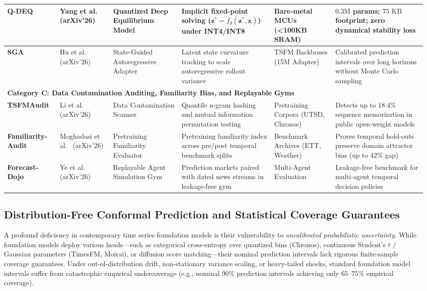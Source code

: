 \begin{table}[t]
{\begin{tabular}{lp{2.2cm}p{3.2cm}p{3.2cm}p{2.6cm}p{4.2cm}}
\midrule
\textbf{Q-DEQ} & Yang et al.~\cite{yang2026qdeq} (arXiv'26) & Quantized Deep Equilibrium Model & Implicit fixed-point solving ($\mathbf{z}^* = f_\theta(\mathbf{z}^*, \mathbf{x})$) under INT4/INT8 & Bare-metal MCUs (<100KB SRAM) & $0.3\text{M}$ params; $75\text{ KB}$ footprint; zero dynamical stability loss \\
\midrule
\textbf{SGA} & Hu et al.~\cite{hu2026sga} (arXiv'26) & State-Guided Autoregressive Adapter & Latent state curvature tracking to scale autoregressive rollout variance & TSFM Backbones (15M Adapter) & Calibrated prediction intervals over long horizons without Monte Carlo sampling \\
\midrule
\multicolumn{6}{l}{\textbf{Category C: Data Contamination Auditing, Familiarity Bias, and Replayable Gyms}} \\
\midrule
\textbf{TSFMAudit} & Li et al.~\cite{li2026tsfmaudit} (arXiv'26) & Data Contamination Scanner & Quantile n-gram hashing and mutual information permutation testing & Pretraining Corpora (UTSD, Chronos) & Detects up to $18.4\%$ sequence memorization in public open-weight models \\
\midrule
\textbf{Familiarity-Audit} & Moghadasi et al.~\cite{moghadasi2026familiarity} (arXiv'26) & Pretraining Familiarity Evaluator & Pretraining familiarity index across pre/post temporal benchmark splits & Benchmark Archives (ETT, Weather) & Proves temporal hold-outs preserve domain attractor bias (up to $42\%$ gap) \\
\midrule
\textbf{Forecast-Dojo} & Ye et al.~\cite{ye2026forecastdojo} (arXiv'26) & Replayable Agent Simulation Gym & Prediction markets paired with dated news streams in leakage-free gym & Multi-Agent Evaluation & Leakage-free benchmark for multi-agent temporal decision policies \\
\bottomrule
\end{tabular}
}
\end{table}

\subsection{Distribution-Free Conformal Prediction and Statistical Coverage Guarantees}
\label{sec:conformal_prediction_guarantees}

A profound deficiency in contemporary time series foundation models is their vulnerability to \emph{uncalibrated probabilistic uncertainty}. While foundation models deploy various heads---such as categorical cross-entropy over quantized bins (Chronos), continuous Student's $t$ / Gaussian parameters (TimesFM, Moirai), or diffusion score matching---their nominal prediction intervals lack rigorous finite-sample coverage guarantees. Under out-of-distribution drift, non-stationary variance scaling, or heavy-tailed shocks, standard foundation model intervals suffer from catastrophic empirical undercoverage (e.g., nominal $90\%$ prediction intervals achieving only $65$--$75\%$ empirical coverage).


